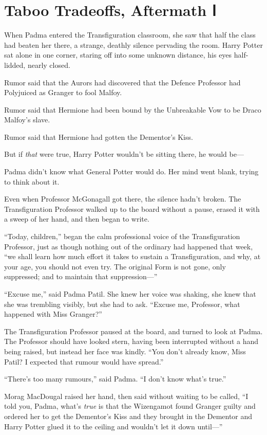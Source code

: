 \chapter{Taboo Tradeoffs, Aftermath Ⅰ}\label{taboo-tradeoffs-aftermath}

When Padma entered the Transfiguration classroom, she saw that half the
class had beaten her there, a strange, deathly silence pervading the
room. Harry Potter sat alone in one corner, staring off into some
unknown distance, his eyes half-lidded, nearly closed.

Rumor said that the Aurors had discovered that the Defence Professor had
Polyjuiced as Granger to fool Malfoy.

Rumor said that Hermione had been bound by the Unbreakable Vow to be
Draco Malfoy's slave.

Rumor said that Hermione had gotten the Dementor's Kiss.

But if \emph{that} were true, Harry Potter wouldn't be sitting there, he
would be---

Padma didn't know what General Potter would do. Her mind went blank,
trying to think about it.

Even when Professor McGonagall got there, the silence hadn't broken. The
Transfiguration Professor walked up to the board without a pause, erased
it with a sweep of her hand, and then began to write.

``Today, children,'' began the calm professional voice of the
Transfiguration Professor, just as though nothing out of the ordinary
had happened that week, ``we shall learn how much effort it takes to
sustain a Transfiguration, and why, at your age, you should not even
try. The original Form is not gone, only suppressed; and to maintain
that suppression---''

``Excuse me,'' said Padma Patil. She knew her voice was shaking, she
knew that she was trembling visibly, but she had to ask. ``Excuse me,
Professor, what happened with Miss Granger?''

The Transfiguration Professor paused at the board, and turned to look at
Padma. The Professor should have looked stern, having been interrupted
without a hand being raised, but instead her face was kindly. ``You
don't already know, Miss Patil? I expected that rumour would have
spread.''

``There's too many rumours,'' said Padma. ``I don't know what's true.''

Morag MacDougal raised her hand, then said without waiting to be called,
``I told you, Padma, what's \emph{true} is that the Wizengamot found
Granger guilty and ordered her to get the Dementor's Kiss and they
brought in the Dementor and Harry Potter glued it to the ceiling and
wouldn't let it down until---''

